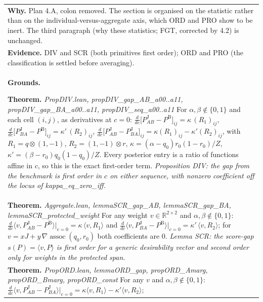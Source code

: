 \documentclass[10pt]{article}
\theoremstyle{definition}
\newcommand{\PB}{P^{\mathrm{B}}}
\newcommand{\PJ}{P^{\mathrm{J}}}
\newcommand{\assoc}{\operatorname{assoc}}
\newcommand{\vv}{v}
\newlength{\fullw}\setlength{\fullw}{25.9cm}
\begin{document}
{\begin{longtable}{|p{0.9cm}|p{12.2cm}|p{12.2cm}|}
\multicolumn{3}{|p{\fullw}|}{\textbf{Why.} Plan 4.A, colon removed. The section is organised on the statistic rather than on the individual-versus-aggregate axis, which ORD and PRO show to be inert. The third paragraph (why these statistics; FGT, corrected by 4.2) is unchanged.} \\
\multicolumn{3}{|p{\fullw}|}{\textbf{Evidence.} DIV and SCR (both primitives first order); ORD and PRO (the classification is settled before averaging).} \\ \hline
\multicolumn{3}{|p{\fullw}|}{\textbf{Grounds.}\par \textbf{Theorem.} \textit{PropDIV.lean, propDIV\_gap\_AB\_a00..a11, propDIV\_gap\_BA\_a00..a11, propDIV\_seq\_a00..a11} \newline For $\alpha,\beta\notin\{0,1\}$ and each cell $(i,j)$, as derivatives at $c=0$:
$\frac{d}{dc}\bigl[\PJ_{AB}-\PB\bigr]_{ij}=\kappa\,(R_1)_{ij}$,
$\frac{d}{dc}\bigl[\PJ_{BA}-\PB\bigr]_{ij}=\kappa'\,(R_2)_{ij}$,
$\frac{d}{dc}\bigl[\PJ_{AB}-\PJ_{BA}\bigr]_{ij}=\kappa(R_1)_{ij}-\kappa'(R_2)_{ij}$, with
$R_1=q\otimes(1,-1)$, $R_2=(1,-1)\otimes r$, $\kappa=(\alpha-q_0)r_0(1-r_0)/Z$,
$\kappa'=(\beta-r_0)q_0(1-q_0)/Z$. Every posterior entry is a ratio of functions affine
in $c$, so this is the exact first-order term. \newline \textit{Proposition DIV: the gap from the benchmark is first order in $c$ on either
sequence, with nonzero coefficient off the locus of kappa\_eq\_zero\_iff.}} \\
\multicolumn{3}{|p{\fullw}|}{\textbf{Theorem.} \textit{Aggregate.lean, lemmaSCR\_gap\_AB, lemmaSCR\_gap\_BA, lemmaSCR\_protected\_weight} \newline For any weight $v\in\mathbb{R}^{2\times2}$ and $\alpha,\beta\notin\{0,1\}$:
$\frac{d}{dc}\langle v,\PJ_{AB}-\PB\rangle\big|_{c=0}=\kappa\,\langle v,R_1\rangle$ and
$\frac{d}{dc}\langle v,\PJ_{BA}-\PB\rangle\big|_{c=0}=\kappa'\,\langle v,R_2\rangle$;
for $v=xJ+y\,\nabla\!\assoc(q_0,r_0)$ both coefficients are $0$. \newline \textit{Lemma SCR: the score-gap $s(P)=\langle\vv,P\rangle$ is first order for a generic
desirability vector and second order only for weights in the protected span.}} \\
\multicolumn{3}{|p{\fullw}|}{\textbf{Theorem.} \textit{PropORD.lean, lemmaORD\_gap, propORD\_Amarg, propORD\_Bmarg, propORD\_const} \newline For any $v$ and $\alpha,\beta\notin\{0,1\}$:
$\frac{d}{dc}\langle v,\PJ_{AB}-\PJ_{BA}\rangle\big|_{c=0}=\kappa\langle v,R_1\rangle-\kappa'\langle v,R_2\rangle$;
}
\end{longtable}}
\end{document}
